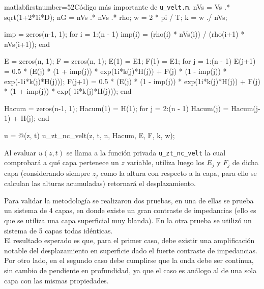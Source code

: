 \clearpage
\begin{sourcecodep}{matlab}{firstnumber=52}{Código más importante de \texttt{u\_velt.m}.}
	nVs = Vs .* sqrt(1+2*1i*D); %
	nG = nVs .* nVs .* rho; %
	w = 2 * pi / T; %
	k = w ./ nVs; %
	
	imp = zeros(n-1, 1);
	for i = 1:(n - 1)
	imp(i) = (rho(i) * nVs(i)) / (rho(i+1) * nVs(i+1));
	end
	
	E = zeros(n, 1);
	F = zeros(n, 1);
	E(1) = E1;
	F(1) = E1; %
	for j = 1:(n - 1)
	E(j+1) = 0.5 * (E(j) * (1 + imp(j)) * exp(1i*k(j)*H(j)) + F(j) * (1 - imp(j)) * exp(-1i*k(j)*H(j)));
	F(j+1) = 0.5 * (E(j) * (1 - imp(j)) * exp(1i*k(j)*H(j)) + F(j) * (1 + imp(j)) * exp(-1i*k(j)*H(j)));
	end
	
	Hacum = zeros(n-1, 1);
	Hacum(1) = H(1);
	for j = 2:(n - 1)
	Hacum(j) = Hacum(j-1) + H(j);
	end
	
	u = @(z, t) u_zt_nc_velt(z, t, n, Hacum, E, F, k, w);
\end{sourcecodep}

Al evaluar $u(z,t)$ se llama a la función privada \texttt{u\_zt\_nc\_velt} la cual comprobará a qué capa pertenece un $z$ variable, utiliza luego los $E_j$ y $F_j$ de dicha capa (considerando siempre $z_j$ como la altura con respecto a la capa, para ello se calculan las alturas acumuladas) retornará el desplazamiento.


Para validar la metodología se realizaron dos pruebas, en una de ellas se prueba un sistema de 4 capas, en donde existe un gran contraste de impedancias (ello es que se utiliza una capa superficial muy blanda). En la otra prueba se utilizó un sistema de 5 capas todas idénticas. \\

El resultado esperado es que, para el primer caso, debe existir una amplificación notable del desplazamiento en superficie dado el fuerte contraste de impedancias. Por otro lado, en el segundo caso debe cumplirse que la onda debe ser contínua, sin cambio de pendiente en profundidad, ya que el caso es análogo al de una sola capa con las mismas propiedades.

